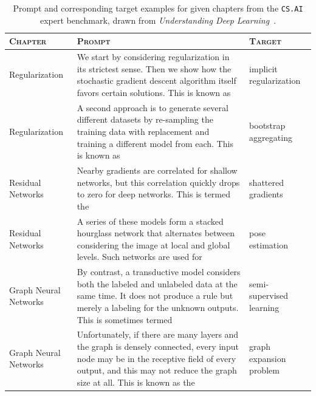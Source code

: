 \documentclass[10pt]{article}
\begin{document}
\begin{table}
    \centering
    \caption{Prompt and corresponding target examples for given chapters from the \texttt{CS.AI} expert benchmark, drawn from \textit{Understanding Deep Learning}~\citep{prince2023understanding}.}
    \renewcommand{\arraystretch}{1.2}
    \begin{tabular}{p{3.5cm}p{9cm}p{2cm}}
\toprule
\textsc{Chapter} & \textsc{Prompt} & \textsc{Target} \\
\midrule
Regularization & We start by considering regularization in its strictest sense. Then we show how the stochastic gradient descent algorithm itself favors certain solutions. This is known as & implicit regularization \\
Regularization & A second approach is to generate several different datasets by re-sampling the training data with replacement and training a different model from each. This is known as & bootstrap aggregating \\
Residual Networks & Nearby gradients are correlated for shallow networks, but this correlation quickly drops to zero for deep networks. This is termed the & shattered gradients \\
Residual Networks & A series of these models form a stacked hourglass network that alternates between considering the image at local and global levels. Such networks are used for & pose estimation \\
Graph Neural Networks & By contrast, a transductive model considers both the labeled and unlabeled data at the same time. It does not produce a rule but merely a labeling for the unknown outputs. This is sometimes termed & semi-supervised learning \\
Graph Neural Networks & Unfortunately, if there are many layers and the graph is densely connected, every input node may be in the receptive field of every output, and this may not reduce the graph size at all. This is known as the & graph expansion problem \\
\bottomrule
    \end{tabular}
    \label{tab:expert-benchmark-examples}
\end{table}
\end{document}
